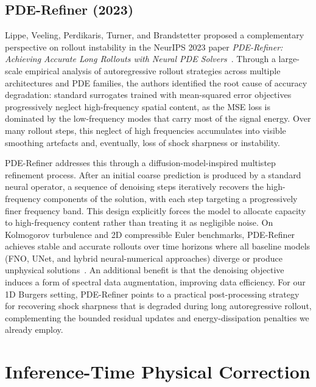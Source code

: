 \subsection{PDE-Refiner (2023)}
\label{sec:bg:pde-refiner}

Lippe, Veeling, Perdikaris, Turner, and Brandstetter proposed a complementary perspective on rollout instability in the NeurIPS 2023 paper \emph{PDE-Refiner: Achieving Accurate Long Rollouts with Neural PDE Solvers}~\cite{lippe2023pderefiner}. Through a large-scale empirical analysis of autoregressive rollout strategies across multiple architectures and PDE families, the authors identified the root cause of accuracy degradation: standard surrogates trained with mean-squared error objectives progressively neglect high-frequency spatial content, as the MSE loss is dominated by the low-frequency modes that carry most of the signal energy. Over many rollout steps, this neglect of high frequencies accumulates into visible smoothing artefacts and, eventually, loss of shock sharpness or instability.

PDE-Refiner addresses this through a diffusion-model-inspired multistep refinement process. After an initial coarse prediction is produced by a standard neural operator, a sequence of denoising steps iteratively recovers the high-frequency components of the solution, with each step targeting a progressively finer frequency band. This design explicitly forces the model to allocate capacity to high-frequency content rather than treating it as negligible noise. On Kolmogorov turbulence and 2D compressible Euler benchmarks, PDE-Refiner achieves stable and accurate rollouts over time horizons where all baseline models (FNO, UNet, and hybrid neural-numerical approaches) diverge or produce unphysical solutions~\cite{lippe2023pderefiner}. An additional benefit is that the denoising objective induces a form of spectral data augmentation, improving data efficiency. For our 1D Burgers setting, PDE-Refiner points to a practical post-processing strategy for recovering shock sharpness that is degraded during long autoregressive rollout, complementing the bounded residual updates and energy-dissipation penalties we already employ.

\section{Inference-Time Physical Correction}
\label{sec:bg:correction}

